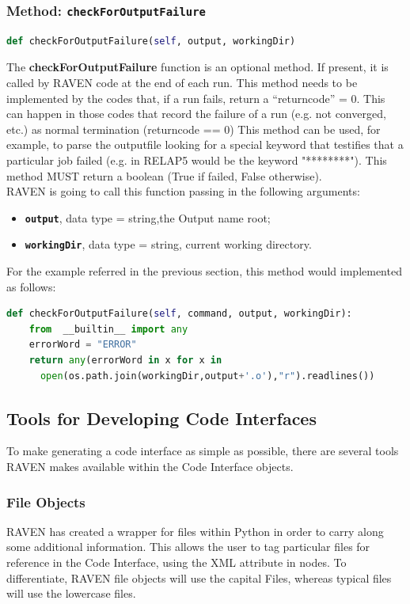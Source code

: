  \subsubsection{Method: \texttt{checkForOutputFailure}} 
\label{subsubsec:checkForOutputFailure}
\begin{lstlisting}[language=python]
def checkForOutputFailure(self, output, workingDir)
\end{lstlisting}
The \textbf{checkForOutputFailure} function is an optional method. If present, it is called 
by RAVEN code at the end of each run. This method needs to be implemented by the codes that, if a run fails, return a ``returncode'' = 0. 
This can happen in those codes that record the failure of a run (e.g. not converged, etc.) as normal termination (returncode == 0)
This method can be used, for example, to parse the outputfile looking for a special keyword that testifies that a particular job  failed
 (e.g. in RELAP5 would be the keyword "********"). This method MUST return a boolean (True if failed, False otherwise).
\\RAVEN is going to call this function passing in the following arguments:
\begin{itemize}
  \item \textbf{\texttt{output}}, data type = string,the Output name root;
  \item  \textbf{\texttt{workingDir}}, data type = string, current working directory.
\end{itemize}
For the example referred in the previous section, this method would implemented as follows:
\newline
\begin{lstlisting}[language=python]
def checkForOutputFailure(self, command, output, workingDir):
    from  __builtin__ import any 
    errorWord = "ERROR"
    return any(errorWord in x for x in 
      open(os.path.join(workingDir,output+'.o'),"r").readlines())
 \end{lstlisting} 
 
\subsection{Tools for Developing Code Interfaces}
To make generating a code interface as simple as possible, there are several tools RAVEN makes available within the Code Interface objects.

\subsubsection{File Objects}
RAVEN has created a wrapper for files within Python in order to carry along some additional information.  This allows the user to tag particular files for reference in the Code Interface, using the  XML attribute in  nodes.  To differentiate, RAVEN file objects will use the capital Files, whereas typical files will use the lowercase files.

